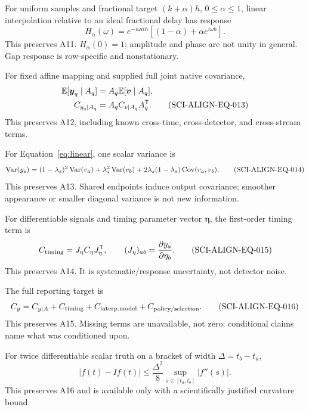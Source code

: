 For uniform samples and fractional target \((k+\alpha)h\),
\(0\leq\alpha\leq1\), linear interpolation relative to an ideal fractional
delay has response
\begin{equation}
 H_\alpha(\omega)=e^{-i\omega\alpha h}
 \left[(1-\alpha)+\alpha e^{i\omega h}\right].
 \tag{SCI-ALIGN-EQ-012}\label{eq:fractional-response}
\end{equation}
\noindent This preserves A11.  \(H_\alpha(0)=1\); amplitude and phase are not
unity in general.  Gap response is row-specific and nonstationary.

For fixed affine mapping and supplied full joint native covariance,
\begin{align}
 \mathbb{E}[\boldsymbol y_q\mid A_q]&=A_q\mathbb{E}[\boldsymbol v\mid A_q],\notag\\
 C_{y_q\mid A_q}&=A_qC_{v\mid A_q}A_q^{\mathsf T}.
 \tag{SCI-ALIGN-EQ-013}\label{eq:covariance}
\end{align}
\noindent This preserves A12, including known cross-time, cross-detector, and
cross-stream terms.

For Equation~\ref{eq:linear}, one scalar variance is
\begin{equation}
 \operatorname{Var}(y_s)=(1-\lambda_s)^2\operatorname{Var}(v_a)+\lambda_s^2\operatorname{Var}(v_b)
 +2\lambda_s(1-\lambda_s)\operatorname{Cov}(v_a,v_b).
 \tag{SCI-ALIGN-EQ-014}\label{eq:linear-variance}
\end{equation}
\noindent This preserves A13.  Shared endpoints induce output covariance;
smoother appearance or smaller diagonal variance is not new information.

For differentiable signals and timing parameter vector
\(\boldsymbol\eta\), the first-order timing term is
\begin{equation}
 C_{\rm timing}=J_\eta C_\eta J_\eta^{\mathsf T},
 \qquad (J_\eta)_{ab}=\frac{\partial y_a}{\partial\eta_b}.
 \tag{SCI-ALIGN-EQ-015}\label{eq:timing-covariance}
\end{equation}
\noindent This preserves A14.  It is systematic/response uncertainty, not
detector noise.

The full reporting target is
\begin{equation}
 C_y=C_{y\mid A}+C_{\rm timing}+C_{\rm interp.model}
 +C_{\rm policy/selection}.
 \tag{SCI-ALIGN-EQ-016}\label{eq:full-uncertainty}
\end{equation}
\noindent This preserves A15.  Missing terms are unavailable, not zero;
conditional claims name what was conditioned upon.

For twice differentiable scalar truth on a bracket of width
\(\Delta=t_b-t_a\),
\begin{equation}
 |f(t)-If(t)|\leq\frac{\Delta^2}{8}
 \sup_{s\in[t_a,t_b]}|f''(s)|.
 \tag{SCI-ALIGN-EQ-017}\label{eq:interp-bound}
\end{equation}
\noindent This preserves A16 and is available only with a scientifically
justified curvature bound.

